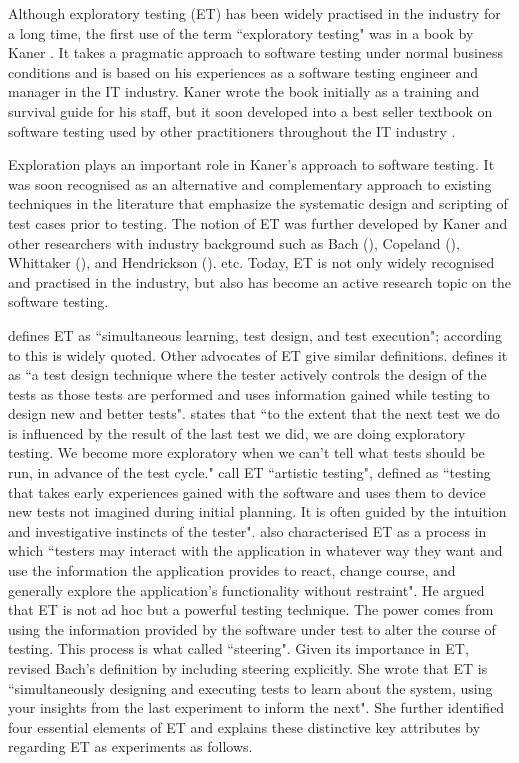 \documentclass[preprint,1p,authoryear,times]{elsarticle}
\begin{document}
Although exploratory testing (ET) has been widely practised in the industry for a long time, the first use of the term ``exploratory testing" was in a book by Kaner \citeyear{Kaner1988}. It takes a pragmatic approach to software testing under normal business conditions and is based on his experiences as a software testing engineer and manager in the IT industry. Kaner wrote the book initially as a training and survival guide for his staff, but it soon developed into a best seller textbook on software testing used by other practitioners throughout the IT industry \citep{Kaner1988, Kaner1999}. 

Exploration plays an important role in Kaner's approach to software testing. It was soon recognised as an alternative and complementary approach to existing techniques in the literature that emphasize the systematic design and scripting of test cases prior to testing. The notion of ET was further developed by Kaner and other researchers with industry background such as Bach (\citeyear{Bach2002, Bach2003}), Copeland (\citeyear{Copeland2004}), Whittaker (\citeyear{whittaker2009exploratory}), and Hendrickson (\citeyear{Hendrickson2013}). etc. Today, ET is not only widely recognised and practised in the industry, but also has become an active research topic on the software testing. 


\cite{Bach2003} defines ET as ``simultaneous learning, test design, and test execution"; according to \cite{Hendrickson2013} this is widely quoted. Other advocates of ET give similar definitions. \citet[Page 113]{Graham_et_al2007} defines it as ``a test design technique where the tester actively controls the design of the tests as those tests are performed and uses information gained while testing to design new and better tests". \citet[Page 202]{Copeland2004} states that ``to the extent that the next test we do is influenced by the result of the last test we did, we are doing exploratory testing. We become more exploratory when we can't tell what tests should be run, in advance of the test cycle."  \citet[Page 339]{Loveland_et_al2005} call ET ``artistic testing", defined as ``testing that takes early experiences gained with the software and uses them to device new tests not imagined during initial planning. It is often guided by the intuition and investigative instincts of the tester". \citet[Page 16]{whittaker2009exploratory} also characterised ET as a process in which ``testers may interact with the application in whatever way they want and use the information the application provides to react, change course, and generally explore the application's functionality without restraint". He argued that ET is not ad hoc but a powerful testing technique.  The power comes from using the information provided by the software under test to alter the course of testing. This process is what \citet[Page 7]{Hendrickson2013} called ``steering". Given its importance in ET, \citet{Hendrickson2013} revised Bach's definition by including steering explicitly. She wrote that ET is ``simultaneously designing and executing tests to learn about the system, using your insights from the last experiment to inform the next". She further identified four essential elements of ET and explains these distinctive key attributes by regarding ET as experiments as follows.
 
\end{document}
